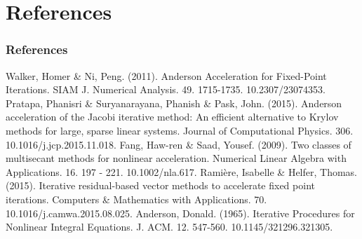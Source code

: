\documentclass{beamer}
\begin{document}
			\section{References}
				
				\begin{frame}
					\frametitle{References}
					\fontsize{6pt}{7.2}\selectfont
					\begin{thebibliography}{99}
						 Walker, Homer \& Ni, Peng. (2011). Anderson Acceleration for Fixed-Point Iterations. SIAM J. Numerical Analysis. 49. 1715-1735. 10.2307/23074353.
						Pratapa, Phanisri \& Suryanarayana, Phanish \& Pask, John. (2015). Anderson acceleration of the Jacobi iterative method: An efficient alternative to Krylov methods for large, sparse linear systems. Journal of Computational Physics. 306. 10.1016/j.jcp.2015.11.018.
						Fang, Haw-ren \& Saad, Yousef. (2009). Two classes of multisecant methods for nonlinear acceleration. Numerical Linear Algebra with Applications. 16. 197 - 221. 10.1002/nla.617.
						Ramière, Isabelle \& Helfer, Thomas. (2015). Iterative residual-based vector methods to accelerate fixed point iterations. Computers \& Mathematics with Applications. 70. 10.1016/j.camwa.2015.08.025.
						Anderson, Donald. (1965). Iterative Procedures for Nonlinear Integral Equations. J. ACM. 12. 547-560. 10.1145/321296.321305.
					\end{thebibliography}
				\end{frame}
			
			
			
			
			
\end{document}
